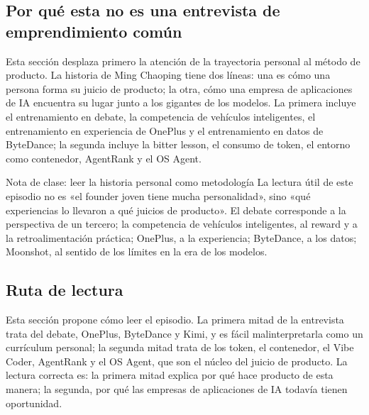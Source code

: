 \documentclass[a4paper]{article}
\begin{document}
\subsection{Por qué esta no es una entrevista de emprendimiento común}

Esta sección desplaza primero la atención de la trayectoria personal al método de producto. La historia de Ming Chaoping tiene dos líneas: una es cómo una persona forma su juicio de producto; la otra, cómo una empresa de aplicaciones de IA encuentra su lugar junto a los gigantes de los modelos. La primera incluye el entrenamiento en debate, la competencia de vehículos inteligentes, el entrenamiento en experiencia de OnePlus y el entrenamiento en datos de ByteDance; la segunda incluye la bitter lesson, el consumo de token, el entorno como contenedor, AgentRank y el OS Agent.

\begin{knowledgebox}{Nota de clase: leer la historia personal como metodología}
La lectura útil de este episodio no es «el founder joven tiene mucha personalidad», sino «qué experiencias lo llevaron a qué juicios de producto». El debate corresponde a la perspectiva de un tercero; la competencia de vehículos inteligentes, al reward y a la retroalimentación práctica; OnePlus, a la experiencia; ByteDance, a los datos; Moonshot, al sentido de los límites en la era de los modelos.
\end{knowledgebox}

\subsection{Ruta de lectura}

Esta sección propone cómo leer el episodio. La primera mitad de la entrevista trata del debate, OnePlus, ByteDance y Kimi, y es fácil malinterpretarla como un currículum personal; la segunda mitad trata de los token, el contenedor, el Vibe Coder, AgentRank y el OS Agent, que son el núcleo del juicio de producto. La lectura correcta es: la primera mitad explica por qué hace producto de esta manera; la segunda, por qué las empresas de aplicaciones de IA todavía tienen oportunidad.
\end{document}
